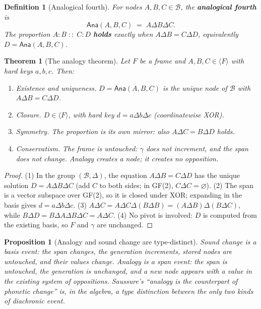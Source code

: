 \documentclass[11pt,a4paper]{article}
\newtheorem{theorem}[principle]{Theorem}
\newtheorem{definition}[principle]{Definition}
\newtheorem{proposition}[principle]{Proposition}
\theoremstyle{remark}
\newcommand{\Lat}{\ensuremath{\mathcal{B}}}              %
\newcommand{\xor}{\ensuremath{\Delta}}                   %
\newcommand{\spanof}[1]{\ensuremath{\langle #1\rangle}}  %
\newcommand{\Gen}{\ensuremath{\gamma}}                   %
\newcommand{\Ana}{\ensuremath{\mathsf{Ana}}}             %
\begin{document}
\begin{definition}[Analogical fourth]
\label{def:analogy}
For nodes $A, B, C \in \Lat$, the \textbf{analogical fourth} is
\[
  \Ana(A,B,C) \;=\; A \xor B \xor C .
\]
The proportion $A:B \;{::}\; C:D$ \textbf{holds} exactly when
$A \xor B = C \xor D$, equivalently $D = \Ana(A,B,C)$.
\end{definition}

\begin{theorem}[The analogy theorem]
\label{thm:analogy}
Let $F$ be a frame and $A,B,C \in \spanof{F}$ with hard keys $a,b,c$. Then:
\begin{enumerate}[leftmargin=*,nosep]
  \item \emph{Existence and uniqueness.} $D = \Ana(A,B,C)$ is the unique node
    of $\Lat$ with $A \xor B = C \xor D$.
  \item \emph{Closure.} $D \in \spanof{F}$, with hard key
    $d = a \xor b \xor c$ (coordinatewise XOR).
  \item \emph{Symmetry.} The proportion is its own mirror: also
    $A \xor C = B \xor D$ holds.
  \item \emph{Conservatism.} The frame is untouched:
    $\Gen$ does not increment, and the span does not change. Analogy creates a
    node; it creates no opposition.
\end{enumerate}
\end{theorem}

\begin{proof}
(1) In the group $(\Lat,\xor)$, the equation $A \xor B = C \xor D$ has the
unique solution $D = A \xor B \xor C$ (add $C$ to both sides; in GF(2),
$C \xor C = \varnothing$). (2) The span is a vector subspace over GF(2), so it
is closed under XOR; expanding in the basis gives $d = a \xor b \xor c$.
(3) $A \xor C = A \xor C \xor (B \xor B) = (A \xor B) \xor (B \xor C)$,
while $B \xor D = B \xor A \xor B \xor C = A \xor C$. (4) No pivot is
involved: $D$ is computed from the existing basis, so $F$ and $\Gen$ are
unchanged.
\end{proof}

\begin{proposition}[Analogy and sound change are type-distinct]
\label{prop:two-forces}
Sound change is a \emph{basis event}: the span changes, the generation
increments, stored nodes are untouched, and their values change. Analogy is a
\emph{span event}: the span is untouched, the generation is unchanged, and a
new node appears with a value in the existing system of oppositions.
Saussure's ``analogy is the counterpart of phonetic change'' is, in the
algebra, a type distinction between the only two kinds of diachronic event.
\end{proposition}
\end{document}
